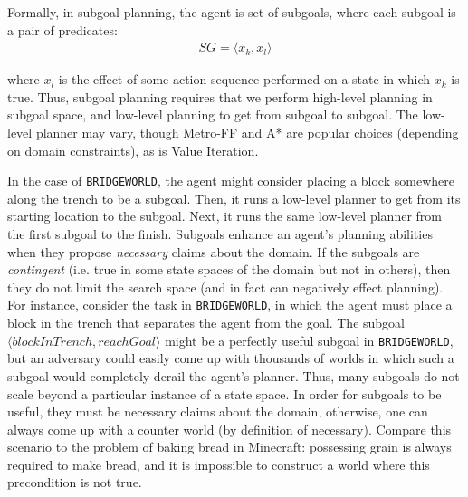 \documentclass[]{article}
\begin{document}
Formally, in subgoal planning, the agent is set of subgoals, where each subgoal is a pair of predicates:
\begin{align}
SG = \langle x_k, x_l \rangle
\end{align}

where $x_l$ is the effect of some action sequence performed on 
a state in which $x_k$ is true. Thus, subgoal planning requires 
that we perform high-level planning in subgoal space, and low-level 
planning to get from subgoal to subgoal. The low-level planner may vary, though
Metro-FF and A* are popular choices (depending on domain constraints), as is Value Iteration.

In the case of \texttt{BRIDGEWORLD}, the agent might consider placing
a block somewhere along the trench to be a subgoal. Then, it runs
a low-level planner to get from its starting location to the subgoal.
Next, it runs the same low-level planner from the first subgoal to the finish.
Subgoals enhance an agent's planning abilities when they propose {\it
  necessary} claims about the domain. If the subgoals are {\it
  contingent} (i.e. true in some state spaces of the domain but not in
others), then they do not limit the search space (and in fact can negatively 
effect planning). For instance, consider the task in \texttt{BRIDGEWORLD}, 
in which the agent must place a block in the trench that separates the agent 
from the goal. The subgoal $\langle blockInTrench, reachGoal\rangle$ might be a
perfectly useful subgoal in \texttt{BRIDGEWORLD}, but an adversary
could easily come up with thousands of worlds in which such a subgoal
would completely derail the agent's planner. Thus, many subgoals do
not scale beyond a particular instance of a state space. In order for
subgoals to be useful, they must be necessary claims about the domain,
otherwise, one can always come up with a counter world (by definition
of necessary).  Compare this scenario to the problem of baking bread
in Minecraft: possessing grain is always required to make bread, and it
is impossible to construct a world where this precondition is not
true.
\end{document}
